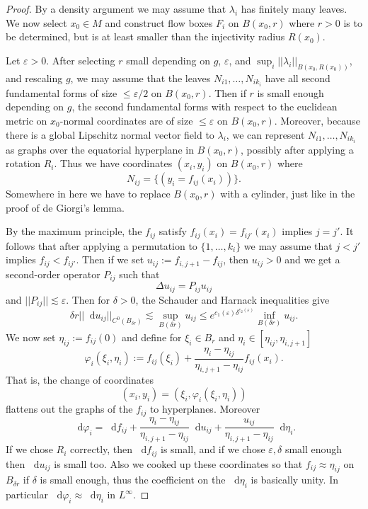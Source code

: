 \documentclass[reqno,10pt]{amsart}
\newcommand*\dif{\mathop{}\!\mathrm{d}}
\theoremstyle{definition}
\numberwithin{equation}{section}
\begin{document}
\begin{proof}
By a density argument we may assume that $\lambda_i$ has finitely many leaves.
We now select $x_0 \in M$ and construct flow boxes $F_i$ on $B(x_0, r)$ where $r > 0$ is to be determined, but is at least smaller than the injectivity radius $R(x_0)$.

Let $\varepsilon > 0$.
After selecting $r$ small depending on $g$, $\varepsilon$, and $\sup_i ||\lambda_i||_{B(x_0, R(x_0))}$, and rescaling $g$, we may assume that the leaves $N_{i1}, \dots, N_{ik_i}$ have all second fundamental forms of size $\leq \varepsilon/2$ on $B(x_0, r)$.
Then if $r$ is small enough depending on $g$, the second fundamental forms with respect to the euclidean metric on $x_0$-normal coordinates are of size $\leq \varepsilon$ on $B(x_0, r)$.
Moreover, because there is a global Lipschitz normal vector field to $\lambda_i$, we can represent $N_{i1}, \dots, N_{ik_i}$ as graphs over the equatorial hyperplane in $B(x_0, r)$, possibly after applying a rotation $R_i$.
Thus we have coordinates $(x_i, y_i)$ on $B(x_0, r)$ where
$$N_{ij} = \{(y_i = f_{ij}(x_i))\}.$$
Somewhere in here we have to replace $B(x_0, r)$ with a cylinder, just like in the proof of de Giorgi's lemma.

By the maximum principle, the $f_{ij}$ satisfy $f_{ij}(x_i) = f_{ij'}(x_i)$ implies $j = j'$.
It follows that after applying a permutation to $\{1, \dots, k_i\}$ we may assume that $j < j'$ implies $f_{ij} < f_{ij'}$.
Then if we set $u_{ij} := f_{i,j+1} - f_{ij}$, then $u_{ij} > 0$ and we get a second-order operator $P_{ij}$ such that
$$\Delta u_{ij} = P_{ij} u_{ij}$$
and $||P_{ij}|| \lesssim \varepsilon$.
Then for $\delta > 0$, the Schauder and Harnack inequalities give
$$\delta r ||\dif u_{ij}||_{C^0(B_{\delta r})} \lesssim \sup_{B(\delta r)} u_{ij} \leq e^{c_1(\varepsilon) \delta^{c_2(\varepsilon)}} \inf_{B(\delta r)} u_{ij}.$$
We now set $\eta_{ij} := f_{ij}(0)$ and define for $\xi_i \in B_r$ and $\eta_i \in [\eta_{ij}, \eta_{i,j+1}]$
$$\varphi_i(\xi_i, \eta_i) := f_{ij}(\xi_i) + \frac{\eta_i - \eta_{ij}}{\eta_{i,j+1} - \eta_{ij}} f_{ij}(x_i).$$
That is, the change of coordinates
$$(x_i, y_i) = (\xi_i, \varphi_i(\xi_i, \eta_i))$$
flattens out the graphs of the $f_{ij}$ to hyperplanes.
Moreover
$$\dif \varphi_i = \dif f_{ij} + \frac{\eta_i - \eta_{ij}}{\eta_{i,j+1} - \eta_{ij}} \dif u_{ij} + \frac{u_{ij}}{\eta_{i,j+1} - \eta_{ij}} \dif \eta_i.$$
If we chose $R_i$ correctly, then $\dif f_{ij}$ is small, and if we chose $\varepsilon, \delta$ small enough then $\dif u_{ij}$ is small too.
Also we cooked up these coordinates so that $f_{ij} \approx \eta_{ij}$ on $B_{\delta r}$ if $\delta$ is small enough, thus the coefficient on the $\dif \eta_i$ is basically unity.
In particular $\dif \varphi_i \approx \dif \eta_i$ in $L^\infty$.


\end{proof}
\end{document}
